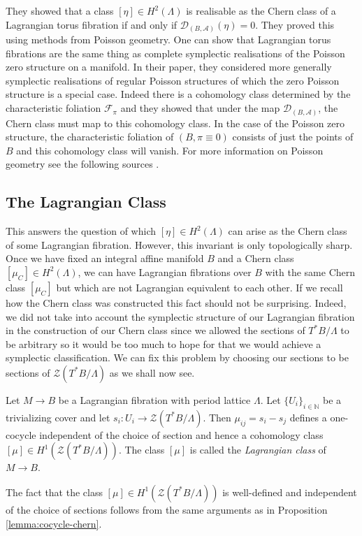They showed that a class $[\eta] \in H^2(\Lambda)$ is realisable as the Chern
class of a Lagrangian torus fibration if and only if $\mathcal{D}_{(B,
    \mathcal{A})}(\eta) = 0$. They proved this using methods from Poisson geometry.
One can show that Lagrangian torus fibrations are the same thing as complete
symplectic realisations of the Poisson zero structure on a manifold. In their
paper, they considered more generally symplectic realisations of regular
Poisson structures of which the zero Poisson structure is a special case.
Indeed there is a cohomology class determined by the characteristic foliation
$\mathcal{F}_{\pi}$ and they showed that under the map $\mathcal{D}_{(B,
    \mathcal{A})}$, the Chern class must map to this cohomology class. In the case
of the Poisson zero structure, the characteristic foliation of $(B, \pi\equiv
    0)$ consists of just the points of $B$ and this cohomology class will vanish.
For more information on Poisson geometry see the following sources
\cite{CrainicFernandesMarcut2021}.

\subsection{The Lagrangian Class}
This answers the question of which $[\eta] \in H^2(\Lambda)$ can arise as the
Chern class of some Lagrangian fibration. However, this invariant is only
topologically sharp. Once we have fixed an integral affine manifold $B$ and a
Chern class $[\mu_{C}] \in H^2(\Lambda)$, we can have Lagrangian fibrations
over $B$ with the same Chern class $[\mu_C]$ but which are not Lagrangian
equivalent to each other. If we recall how the Chern class was constructed this
fact should not be surprising. Indeed, we did not take into account the
symplectic structure of our Lagrangian fibration in the construction of our
Chern class since we allowed the sections of $T^*B/\Lambda$ to be arbitrary so
it would be too much to hope for that we would achieve a symplectic
classification. We can fix this problem by choosing our sections to be sections
of $\mathcal{Z}(T^*B/\Lambda)$ as we shall now see.

\begin{definition}
    Let $M \to B$ be a Lagrangian fibration with period lattice $\Lambda$. Let $\{U_i\}_{i \in \mathbb{N}}$ be a trivializing cover and let
    $s_i: U_i \to \mathcal{Z}(T^*B/\Lambda)$. Then $\mu_{ij} = s_i -s_j$ defines a one-cocycle independent of the choice of section and hence a
    cohomology class $[\mu] \in H^1(\mathcal{Z}(T^*B/\Lambda))$. The class $[\mu]$ is called the \emph{Lagrangian class} of $M \to B$.
\end{definition}
\begin{remark}
    The fact that the class $[\mu] \in H^1(\mathcal{Z}(T^*B/\Lambda))$ is well-defined and independent of the choice of sections follows from the same arguments as in Proposition \ref{lemma:cocycle-chern}.
\end{remark}

